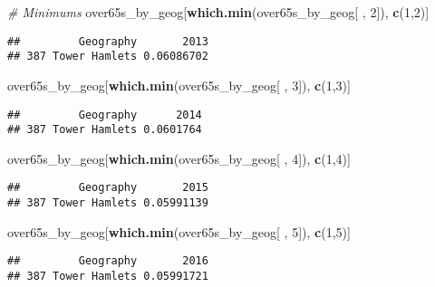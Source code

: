 \documentclass[]{article}
\newenvironment{Shaded}{\begin{snugshade}}{\end{snugshade}}
\newcommand{\KeywordTok}[1]{\textcolor[rgb]{0.13,0.29,0.53}{\textbf{#1}}}
\newcommand{\DecValTok}[1]{\textcolor[rgb]{0.00,0.00,0.81}{#1}}
\newcommand{\CommentTok}[1]{\textcolor[rgb]{0.56,0.35,0.01}{\textit{#1}}}
\newcommand{\NormalTok}[1]{#1}
\begin{document}
\begin{Shaded}
\begin{Highlighting}[]
\CommentTok{# Minimums}
\NormalTok{over65s_by_geog[}\KeywordTok{which.min}\NormalTok{(over65s_by_geog[ , }\DecValTok{2}\NormalTok{]), }\KeywordTok{c}\NormalTok{(}\DecValTok{1}\NormalTok{,}\DecValTok{2}\NormalTok{)]}
\end{Highlighting}
\end{Shaded}

\begin{verbatim}
##         Geography       2013
## 387 Tower Hamlets 0.06086702
\end{verbatim}

\begin{Shaded}
\begin{Highlighting}[]
\NormalTok{over65s_by_geog[}\KeywordTok{which.min}\NormalTok{(over65s_by_geog[ , }\DecValTok{3}\NormalTok{]), }\KeywordTok{c}\NormalTok{(}\DecValTok{1}\NormalTok{,}\DecValTok{3}\NormalTok{)]}
\end{Highlighting}
\end{Shaded}

\begin{verbatim}
##         Geography      2014
## 387 Tower Hamlets 0.0601764
\end{verbatim}

\begin{Shaded}
\begin{Highlighting}[]
\NormalTok{over65s_by_geog[}\KeywordTok{which.min}\NormalTok{(over65s_by_geog[ , }\DecValTok{4}\NormalTok{]), }\KeywordTok{c}\NormalTok{(}\DecValTok{1}\NormalTok{,}\DecValTok{4}\NormalTok{)]}
\end{Highlighting}
\end{Shaded}

\begin{verbatim}
##         Geography       2015
## 387 Tower Hamlets 0.05991139
\end{verbatim}

\begin{Shaded}
\begin{Highlighting}[]
\NormalTok{over65s_by_geog[}\KeywordTok{which.min}\NormalTok{(over65s_by_geog[ , }\DecValTok{5}\NormalTok{]), }\KeywordTok{c}\NormalTok{(}\DecValTok{1}\NormalTok{,}\DecValTok{5}\NormalTok{)]}
\end{Highlighting}
\end{Shaded}

\begin{verbatim}
##         Geography       2016
## 387 Tower Hamlets 0.05991721
\end{verbatim}
\end{document}
